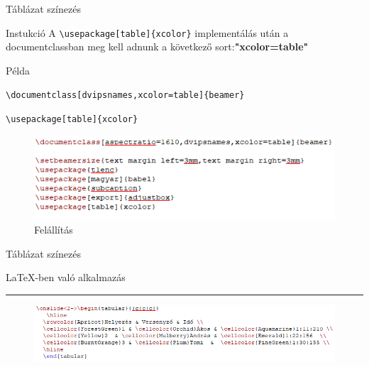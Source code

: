 \documentclass[aspectratio=1610, dvipsnames, xcolor=table]{beamer}
\begin{document}
    \begin{frame}[fragile]{Táblázat színezés}
        \begin{block}{Instukció}
            A \verb!\usepackage[table]{xcolor}! implementálás után a documentclassban meg kell adnunk a következő sort:\textbf{"xcolor=table"}
        \end{block} 
        \begin{exampleblock}{Példa}
        {
            \verb!\documentclass[dvipsnames,xcolor=table]{beamer}!

            \verb!\usepackage[table]{xcolor}!
        }
        \end{exampleblock}	
        \begin{figure}[H]
            \includegraphics[scale=0.8]{img/tablesetup.png}
            \caption{Felállítás}
        \end{figure}
    \end{frame}

    \begin{frame}[fragile]{Táblázat színezés}
    \begin{center}
        \LaTeX-ben való alkalmazás
        \noindent
        {\color{Dandelion} \rule{\linewidth}{1mm}}
    \end{center}
    
        \begin{figure}[H]
           \includegraphics[scale=0.8]{img/tablealkalmazas.png}        
        \end{figure}
    \end{frame}
\end{document}
